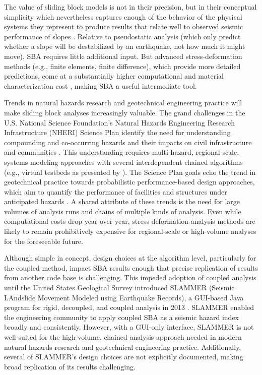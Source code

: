 \documentclass[preprint,review,12pt]{elsarticle}
\begin{document}
The value of sliding block models is not in their precision, but in their conceptual simplicity which nevertheless captures enough of the behavior of the physical systems they represent to produce results that relate well to observed seismic performance of slopes \cite{jibson_method_2000}. 
Relative to pseudostatic analysis (which only predict whether a slope will be destabilized by an earthquake, not how much it might move), SBA requires little additional input.
But advanced stress-deformation methods (e.g., finite elements, finite difference), which provide more detailed predictions, come at a substantially higher computational and material characterization cost \citep{jibson_methods_2011}, making SBA a useful intermediate tool.

Trends in natural hazards research and geotechnical engineering practice will  make sliding block analyses increasingly valuable.
The grand challenges in the U.S. National Science Foundation's Natural Hazards Engineering Research Infrastructure (NHERI) Science Plan identify the need for understanding compounding and co-occurring hazards and their impacts on civil infrastructure and communities \citep{robertson_natural_2023}.
This understanding requires multi-hazard, regional-scale, systems modeling approaches with several interdependent chained algorithms (e.g., virtual testbeds as presented by \cite{enderami_virtual_2023}).
The Science Plan goals echo the trend in geotechnical practice towards probabilistic performance-based design approaches, which aim to quantify the performance of facilities and structures under anticipated hazards \citep{kramer_evolution_2024}.
A shared attribute of these trends is the need for large volumes of analysis runs and chains of multiple kinds of analysis.
Even while computational costs drop year over year, stress-deformation analysis methods are likely to remain prohibitively expensive for regional-scale or high-volume analyses for the foreseeable future.

Although simple in concept, design choices at the algorithm level, particularly for the coupled method, impact SBA results enough that precise replication of results from another code base is challenging.
This impeded adoption of coupled analysis until the United States Geological Survey introduced SLAMMER (Seismic LAndslide Movement Modeled using Earthquake Records), a GUI-based Java program for rigid, decoupled, and coupled analysis in 2013 \citep{jibson_slammer_2013}.
SLAMMER enabled the engineering community to apply coupled SBA as a seismic hazard index broadly and consistently.
However, with a GUI-only interface, SLAMMER is not well-suited for the high-volume, chained analysis approach needed in modern natural hazards research and geotechnical engineering practice.
Additionally, several of SLAMMER's design choices are not explicitly documented, making broad replication of its results challenging.
\end{document}
